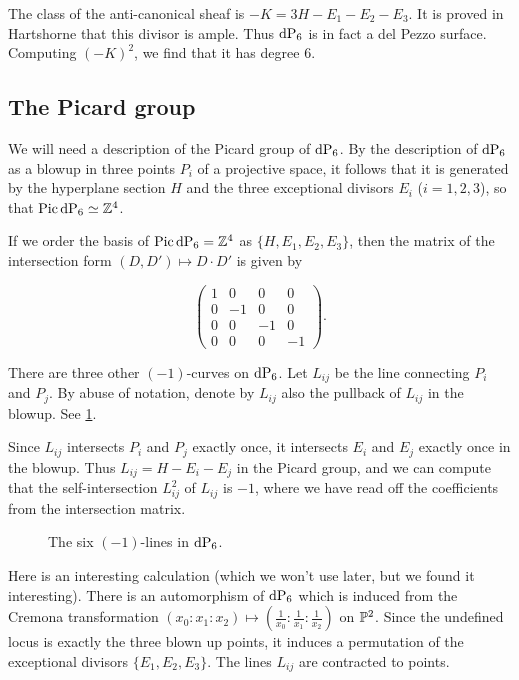 The class of the anti-canonical sheaf is $-K = 3H - E_1 - E_2 - E_3$. It is proved in Hartshorne that this divisor is ample. Thus $\dP6$ is in fact a del Pezzo surface. Computing $(-K)^2$, we find that it has degree $6$.

\subsection{The Picard group}

We will need a description of the Picard group of $\dP6$. By the description of $\dP6$ as a blowup in three points $P_i$ of a projective space, it follows that it is generated by the hyperplane section $H$ and the three exceptional divisors $E_i$ ($i=1,2,3$), so that $\Pic \dP6 \simeq \Z^4$. 

If we order the basis of $\Pic \dP6 = \Z^4$ as $\{ H, E_1, E_2, E_3 \}$, then the matrix of the intersection form $(D,D') \mapsto D \cdot D'$ is given by 

\[
\begin{pmatrix}
1 & 0 & 0 & 0 \\
0 & -1 & 0 & 0 \\
0 & 0  &-1 & 0 \\
0 & 0  & 0 & -1
\end{pmatrix}.
\]

There are three other $(-1)$-curves on $\dP6$. Let $L_{ij}$ be the line connecting $P_i$ and $P_j$. By abuse of notation, denote by $L_{ij}$ also the pullback of $L_{ij}$ in the blowup. See \cref{fig:blowup_hexagon}. 

Since $L_{ij}$ intersects $P_i$ and $P_j$ exactly once, it intersects $E_i$ and $E_j$ exactly once in the blowup. Thus $L_{ij}=H-E_i-E_j$ in the Picard group, and we can compute that the self-intersection $L_{ij}^2$ of $L_{ij}$ is $-1$, where we have read off the coefficients from the intersection matrix.

\begin{figure}
\centering 

\caption{The six $(-1)$-lines in $\dP6$.}
\label{fig:blowup_hexagon}
\end{figure}

Here is an interesting calculation (which we won't use later, but we found it interesting). There is an automorphism of $\dP6$ which is induced from the Cremona transformation $(x_0:x_1:x_2) \mapsto \left( \frac 1{x_0} : \frac 1{x_1} : \frac 1{x_2}\right)$ on $\P^2$. Since the undefined locus is exactly the three blown up points, it induces a permutation of the exceptional divisors $\{E_1,E_2,E_3\}$. The lines $L_{ij}$ are contracted to points.

